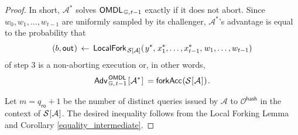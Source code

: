 \documentclass{iacrtrans}
\begin{document}
\begin{proof}
In short, $\mathcal{A}^*$ solves
$\mathsf{OMDL}
	_{\hspace{1pt}\mathbb{G},\hspace{0.5pt} t-1}$
exactly if it does not abort.
Since $w_0, w_1, \dots, w_{t-1}$
are uniformly sampled by its challenger,
$\mathcal{A}^*$'s advantage is equal to the probability that
\vspace{5pt}
\begin{equation*}
    		(
				\vspace{1pt}
				b,
				\vspace{1pt}
				\mathsf{out}
				\hspace{0.5pt}
			)
			\hspace{2pt}
			\leftarrow
			\hspace{2pt}
    		\mathsf{LocalFork}_{
				\hspace{1pt}
    			\mathcal{S}
    			\hspace{0pt}[
    				\hspace{0pt}
    				\mathcal{A}
    				\hspace{0pt}
    			]
    		}
			(
   				\hspace{1pt}
				y ^*,
				\hspace{1pt}
				x_1^*, \dots, x_{t-1}^*,
				\hspace{1pt}
				w_1, \dots, w_{t-1}
   			)
\vspace{5pt}
\end{equation*}
\noindent
of step 3 is a non-aborting execution or, in other words,
\vspace{5pt}
\begin{equation*}
	\mathsf{Adv}
		_{\hspace{1pt}\mathbb{G},\hspace{1pt} t-1}
		^{\hspace{1pt}\mathsf{OMDL}}
		\hspace{1pt}
		[
			\hspace{0.5pt}
			\mathcal{A}^*
			\hspace{0.5pt}
		]
	\hspace{2pt}
	=
	\mathsf{forkAcc}
		\hspace{0.5pt}
		(
			\mathcal{S}
			\hspace{0.5pt}
			[
				\hspace{0.5pt}
				\mathcal{A}
				\hspace{0.5pt}
			]
			\hspace{0.5pt}
		)\hspace{1pt}.
\vspace{5pt}
\end{equation*}

\noindent
Let $m = q_{\mathsf{ro}} + 1$ be the number of distinct
queries issued by $\mathcal{A}$ to $\mathcal{O}^{\mathsf{hash}}$
in the context of
$\mathcal{S}\hspace{0.5pt}[\hspace{0.5pt}\mathcal{A}\hspace{0.5pt}]$.
The desired inequality follows from the
Local Forking Lemma
and Corollary \ref{equality_intermediate}.
\end{proof}
\end{document}

